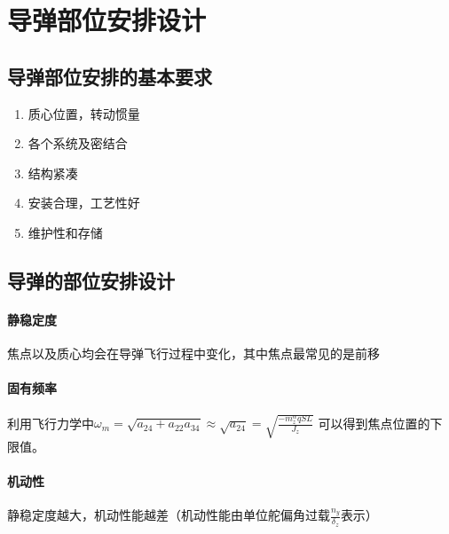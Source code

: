 \chapter{导弹部位安排设计}
\section{导弹部位安排的基本要求}
\begin{enumerate}
    \item 质心位置，转动惯量
    \item 各个系统及密结合
    \item 结构紧凑
    \item 安装合理，工艺性好
    \item 维护性和存储
\end{enumerate}
\section{导弹的部位安排设计}
\subsubsection*{静稳定度}
焦点以及质心均会在导弹飞行过程中变化，其中焦点最常见的是前移
\subsubsection*{固有频率}
利用飞行力学中$\omega_m = \sqrt{a_{24}+a_{22}a_{34}}\approx\sqrt{a_{24}} = \sqrt{\frac{-m_z^{\alpha}qSL}{J_z}}$
可以得到焦点位置的下限值。
\subsubsection*{机动性}
静稳定度越大，机动性能越差（机动性能由单位舵偏角过载$\frac{n_y}{\delta_z}$表示）
